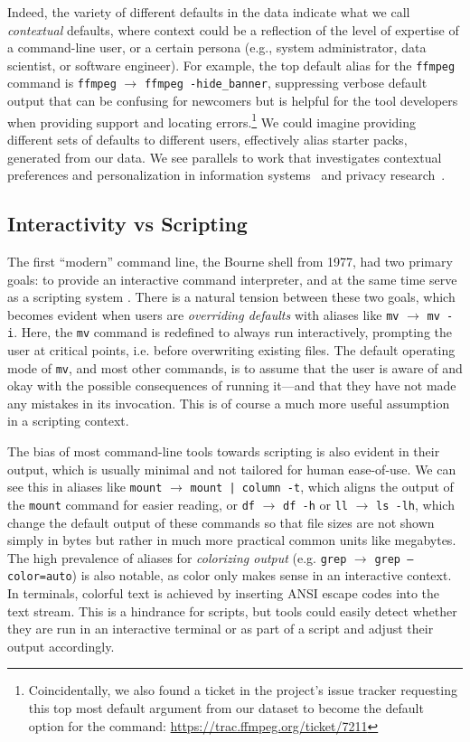 \documentclass[smallextended,natbib]{svjour3}
\newcommand{\alias}[2]{{\texttt{#1} $\rightarrow$ \texttt{#2}}}
\newcommand{\cmd}[1]{{\texttt{#1}}}
\begin{document}
Indeed, the variety of different defaults in the data indicate what we call \emph{contextual} defaults, where context could be a reflection of the level of expertise of a command-line user, or a certain persona (e.g., system administrator, data scientist, or software engineer).
For example, the top default alias for the \cmd{ffmpeg} command is \alias{ffmpeg}{ffmpeg -hide\_banner}, suppressing verbose default output that can be confusing for newcomers but is helpful for the tool developers when providing support and locating errors.\footnote{Coincidentally, we also found a ticket in the project's issue tracker requesting this top most default argument from our dataset to become the default option for the command: \url{https://trac.ffmpeg.org/ticket/7211}}
We could imagine providing different sets of defaults to different users, effectively alias starter packs, generated from our data.
We see parallels to work that investigates contextual preferences and personalization in information systems~\citep{de:15, stefanidis:11} and privacy research~\citep{wijesekera:18, alom:19}.

\subsection{Interactivity vs Scripting}
\label{sec:interactivity-vs-scripting}

The first ``modern'' command line, the Bourne shell from 1977, had two primary goals: to provide an interactive command interpreter, and at the same time serve as a scripting system \citep{jones:11}.
There is a natural tension between these two goals, which becomes evident when users are \emph{overriding defaults} with aliases like \alias{mv}{mv~-i}.
Here, the \cmd{mv} command is redefined to always run interactively, prompting the user at critical points, i.e. before overwriting existing files.
The default operating mode of \cmd{mv}, and most other commands, is to assume that the user is aware of and okay with the possible consequences of running it---and that they have not made any mistakes in its invocation.
This is of course a much more useful assumption in a scripting context.

The bias of most command-line tools towards scripting is also evident in their output, which is usually minimal and not tailored for human ease-of-use.
We can see this in aliases like \alias{mount}{mount | column -t}, which aligns the output of the \cmd{mount} command for easier reading, or \alias{df}{df~-h} or \alias{ll}{ls~-lh}, which change the default output of these commands so that file sizes are not shown simply in bytes but rather in much more practical common units like megabytes.
The high prevalence of aliases for \emph{colorizing output} (e.g. \alias{grep}{grep --color=auto}) is also notable, as color only makes sense in an interactive context.
In terminals, colorful text is achieved by inserting ANSI escape codes into the text stream.
This is a hindrance for scripts, but tools could easily detect whether they are run in an interactive terminal or as part of a script and adjust their output accordingly.
\end{document}
